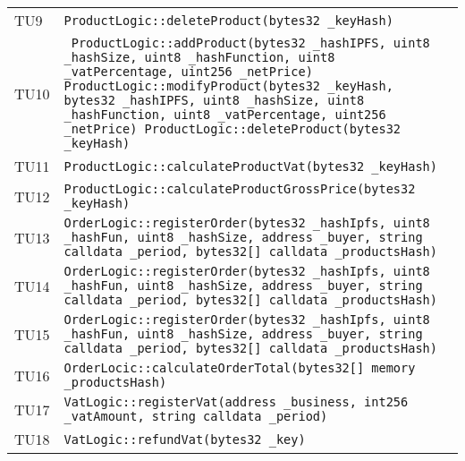 \begin{longtable}{ >{\centering}p{} >{}p{}}
			\hypertarget{TU9}{TU9} & 
			\texttt{ProductLogic::deleteProduct(bytes32 \_keyHash)}\\
			
			\hypertarget{TU10}{TU10} & \texttt{ 
			ProductLogic::addProduct(bytes32 \_hashIPFS, uint8 \_hashSize, 
			uint8 \_hashFunction, uint8 \_vatPercentage, uint256 
			\_netPrice) \newline \newline
			ProductLogic::modifyProduct(bytes32 \_keyHash, 
			bytes32 \_hashIPFS, uint8 \_hashSize, uint8 \_hashFunction, uint8 
			\_vatPercentage, uint256 \_netPrice)\newline \newline
			ProductLogic::deleteProduct(bytes32 \_keyHash)}\\
			
			\hypertarget{TU11}{TU11} & 
			\texttt{ProductLogic::calculateProductVat(bytes32 \_keyHash)}\\
			
			\hypertarget{TU12}{TU12} & 
			\texttt{ProductLogic::calculateProductGrossPrice(bytes32 
			\_keyHash)}\\
		
			\hypertarget{TU13}{TU13} & 
			\texttt{OrderLogic::registerOrder(bytes32 \_hashIpfs, uint8 
			\_hashFun, uint8 \_hashSize, address \_buyer, string calldata 
			\_period, bytes32[] calldata \_productsHash)}\\
		
			\hypertarget{TU14}{TU14} & 
			\texttt{OrderLogic::registerOrder(bytes32 \_hashIpfs, uint8 
				\_hashFun, uint8 \_hashSize, address \_buyer, string calldata 
				\_period, bytes32[] calldata \_productsHash)}\\
			
			\hypertarget{TU15}{TU15} & 
			\texttt{OrderLogic::registerOrder(bytes32 \_hashIpfs, uint8 
				\_hashFun, uint8 \_hashSize, address \_buyer, string calldata 
				\_period, bytes32[] calldata \_productsHash)}\\
			
			\hypertarget{TU16}{TU16} & 
			\texttt{OrderLocic::calculateOrderTotal(bytes32[] memory 
			\_productsHash)}\\
			
			\hypertarget{TU17}{TU17} & \texttt{VatLogic::registerVat(address 
			\_business, int256 \_vatAmount, string calldata \_period)}\\
			
			\hypertarget{TU18}{TU18} & \texttt{VatLogic::refundVat(bytes32 
			\_key)}\\
			

\end{longtable}
